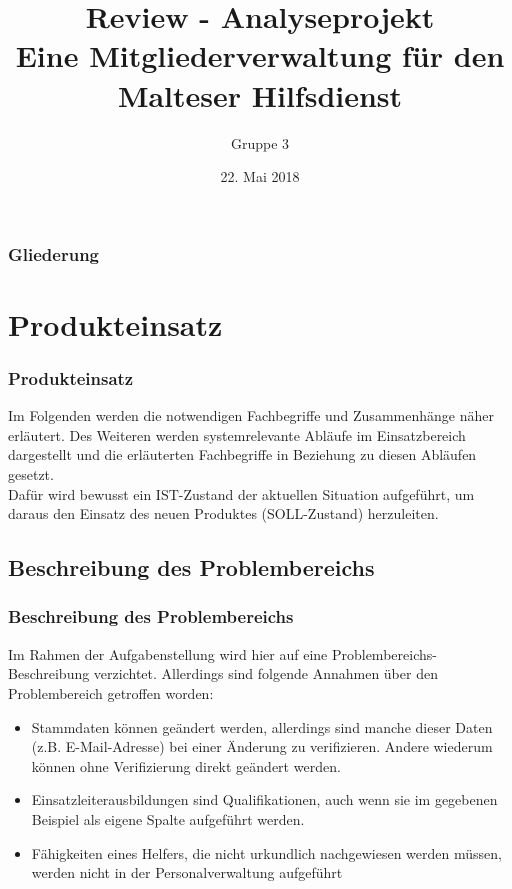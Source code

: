\documentclass{beamer}
\begin{document}
			
	
	\title[Review - Analyseprojekt]{Review - Analyseprojekt\\ Eine Mitgliederverwaltung für den Malteser Hilfsdienst}
	\author{Gruppe 3}
	
	 \begin{frame}[title=Hauptgebaeude_Nacht.jpg]
	 \maketitle
	 \date{22. Mai 2018}
 	\end{frame}
	 
	\begin{frame}
		\frametitle{Gliederung}
		\tableofcontents
	\end{frame}

\section{Produkteinsatz}		
\begin{frame}
\frametitle{Produkteinsatz}
Im Folgenden werden die notwendigen Fachbegriffe und Zusammenhänge näher erläutert. Des Weiteren werden systemrelevante Abläufe im Einsatzbereich dargestellt und die erläuterten Fachbegriffe in Beziehung zu diesen Abläufen gesetzt.\\
Dafür wird bewusst ein IST-Zustand der aktuellen Situation aufgeführt, um daraus den Einsatz des neuen Produktes (SOLL-Zustand) herzuleiten.
\end{frame}

\subsection{Beschreibung des Problembereichs}		
\begin{frame}
\frametitle{Beschreibung des Problembereichs}
Im Rahmen der Aufgabenstellung wird hier auf eine Problembereichs-Beschreibung verzichtet. Allerdings sind folgende Annahmen über den Problembereich getroffen worden:
\begin{itemize}
\item Stammdaten können geändert werden, allerdings sind manche dieser Daten (z.B. E-Mail-Adresse) bei einer Änderung zu verifizieren. Andere wiederum können ohne Verifizierung direkt geändert werden.
\item Einsatzleiterausbildungen sind Qualifikationen, auch wenn sie im gegebenen Beispiel als eigene Spalte aufgeführt werden.
\item Fähigkeiten eines Helfers, die nicht urkundlich nachgewiesen werden müssen, werden nicht in der Personalverwaltung aufgeführt
\end{itemize}
\end{frame}
\end{document}
